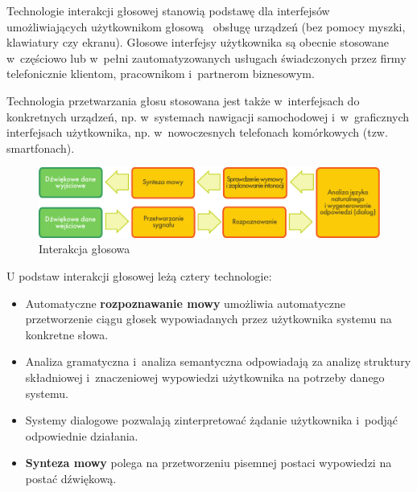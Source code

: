 \begin{multicols}{2}
Technologie interakcji głosowej stanowią podstawę dla interfejsów
umożliwiających użytkownikom głosową \ obsługę urządzeń (bez
pomocy myszki, klawiatury czy ekranu). Głosowe interfejsy
użytkownika są obecnie stosowane w~częściowo lub w~pełni
zautomatyzowanych usługach świadczonych przez firmy telefonicznie
klientom, pracownikom i~partnerom biznesowym. 


Technologia przetwarzania głosu stosowana jest także w~interfejsach
do konkretnych urządzeń, np. w~systemach nawigacji samochodowej
i~w~graficznych interfejsach użytkownika, np. w~nowoczesnych
telefonach komórkowych (tzw. smartfonach). 

\begin{figure}[htb]  \center
\includegraphics[width=\textwidth]{../_media/polish/simple_speech-based_dialogue_architecture}
\caption{Interakcja głosowa} \label{fig:dialoguearch_pl}
 \end{figure} 

U podstaw interakcji głosowej leżą cztery technologie: 

\begin{itemize} \item Automatyczne \textbf{rozpoznawanie mowy}
umożliwia automatyczne przetworzenie ciągu głosek wypowiadanych
przez użytkownika systemu na konkretne słowa. \item Analiza
gramatyczna i~analiza semantyczna odpowiadają za analizę struktury
składniowej i~znaczeniowej wypowiedzi użytkownika na potrzeby danego
systemu. \item Systemy dialogowe pozwalają zinterpretować żądanie
użytkownika i~podjąć odpowiednie działania. \item \textbf{Synteza
mowy} polega na przetworzeniu pisemnej postaci wypowiedzi na postać
dźwiękową. \end{itemize} 


\end{multicols}

